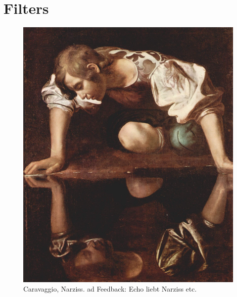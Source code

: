 \chapter{Filters}
\label{chap:filters}


\begin{figure}[H]
	\begin{center}
		\includegraphics[width = 14cm]{img/Narciss_Caravaggio.jpg}
		\caption{Caravaggio, Narziss. ad Feedback: Echo liebt Narziss etc.}
		\label{fig:name}
	\end{center}
\end{figure}

